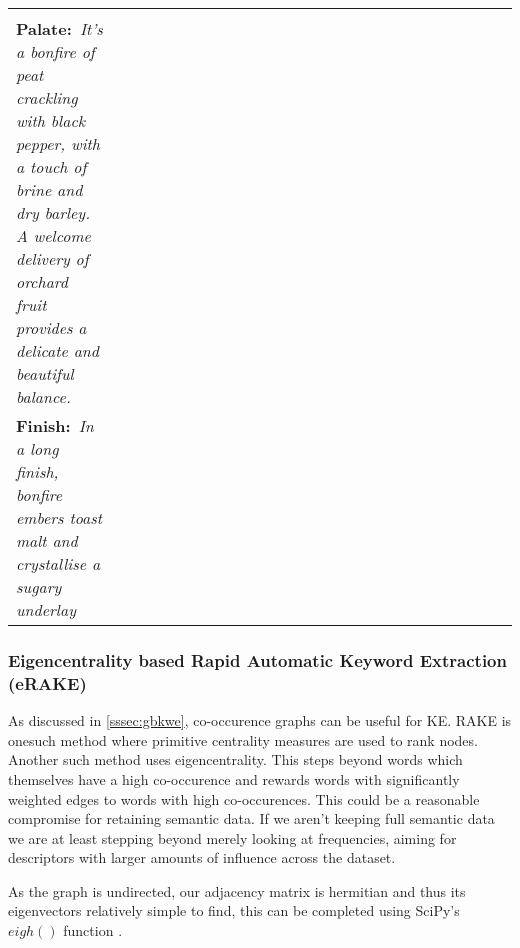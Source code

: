 \begin{table}
\begin{tabular}{p{0.2\linewidth} p{0.8\linewidth}}
\begin{minipage}[t]{0.8\columnwidth}
{            }\\\textbf{Palate:}\textit{~It's a bonfire of peat crackling with black pepper, with a touch of brine 
            and dry barley. A welcome delivery of orchard fruit provides a delicate and beautiful balance.
            }\\\textbf{Finish:}~\textit{In a long finish, bonfire embers toast malt and crystallise a sugary underlay
            }\end{minipage}                                                                                                                                                                                                                                                    \\
        \toprule
    \end{tabular}
\end{table}

\subsubsection{Eigencentrality based Rapid Automatic Keyword Extraction (eRAKE)}\label{ssec:erake}
As discussed in \autoref{sssec:gbkwe}, co-occurence graphs can be useful for KE.  RAKE is onesuch method where primitive
centrality measures are used to rank nodes.  Another such method uses eigencentrality.  This steps beyond words which
themselves have a high co-occurence and rewards words with significantly weighted edges to words with high co-occurences.
This could be a reasonable compromise for retaining semantic data.  If we aren't keeping full semantic data we are
at least stepping beyond merely looking at frequencies, aiming for descriptors with larger amounts of influence across
the dataset.

As the graph is undirected, our adjacency matrix is hermitian and thus its eigenvectors relatively simple to find,
this can be completed using SciPy's $eigh()$ function \cite{hubbard_2020, 2020NumPy}.